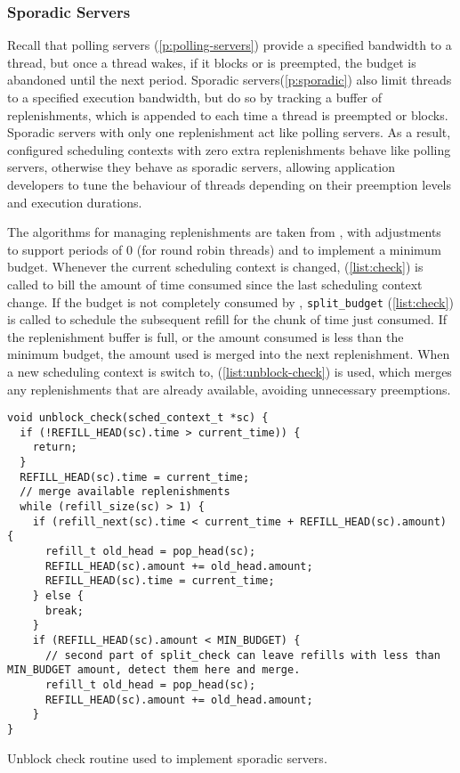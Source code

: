 \subsubsection{Sporadic Servers}
\label{sec:impl-sporadic}

Recall that polling servers (\cref{p:polling-servers}) provide a specified bandwidth to a thread,
but once a thread wakes, if it blocks or is preempted, the budget is abandoned until the next
period. Sporadic servers(\cref{p:sporadic}) also limit threads to a specified execution bandwidth,
but do so by tracking a buffer of replenishments, which is appended to each time a thread is
preempted or blocks. Sporadic servers with only one replenishment act like polling servers.
As a result, configured scheduling contexts with zero extra replenishments behave like polling servers,
otherwise they behave as sporadic servers,  allowing application developers to
tune the behaviour of threads depending on their preemption levels and execution durations.

The algorithms for managing replenishments are taken from \citet{Danish_LW_11}, with adjustments to
support periods of 0 (for round robin threads) and to implement a minimum budget.  Whenever the
current scheduling context is changed,  (\cref{list:check}) is called to bill the amount of time consumed since the last scheduling
context change. If the budget is not completely consumed by ,
\texttt{split\_budget} (\cref{list:check}) is called to schedule the
subsequent refill for the chunk of time just consumed.  If the replenishment buffer is full, or the
amount consumed is less than the minimum budget, the amount used is merged into the next
replenishment.  When a new scheduling context is switch to,  
(\cref{list:unblock-check}) is used, which merges any replenishments that are already available,
avoiding unnecessary preemptions.

\begin{listing}[t!]
\begin{verbatim}
void unblock_check(sched_context_t *sc) {
  if (!REFILL_HEAD(sc).time > current_time)) {
    return;
  }
  REFILL_HEAD(sc).time = current_time;
  // merge available replenishments
  while (refill_size(sc) > 1) {
    if (refill_next(sc).time < current_time + REFILL_HEAD(sc).amount) {
      refill_t old_head = pop_head(sc);
      REFILL_HEAD(sc).amount += old_head.amount;
      REFILL_HEAD(sc).time = current_time;
    } else {
      break;
    }
    if (REFILL_HEAD(sc).amount < MIN_BUDGET) {
      // second part of split_check can leave refills with less than MIN_BUDGET amount, detect them here and merge.
      refill_t old_head = pop_head(sc);
      REFILL_HEAD(sc).amount += old_head.amount;
    }
}
\end{verbatim}
\caption[Unblock check routine.]{Unblock check routine used to implement sporadic servers.}
\label{list:unblock-check}
\end{listing}


